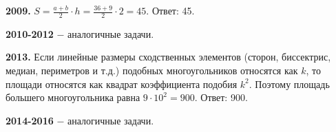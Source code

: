 \textbf{2009.} $S = \frac{a+b}{2}\cdot h = \frac{36+9}{2}\cdot 2=45.$ \newline \null \hspace*{\fill} Ответ: 45.

\textbf{2010-2012} $-$ аналогичные задачи.

\textbf{2013.} Если линейные размеры сходственных элементов (сторон, биссектрис, медиан, периметров и т.д.) подобных многоугольников относятся как $k$, то площади относятся как квадрат коэффициента подобия $k^2$. Поэтому площадь большего многоугольника равна $9\cdot10^2=900.$ \newline \null \hspace*{\fill} Ответ: 900.

\textbf{2014-2016} $-$ аналогичные задачи.